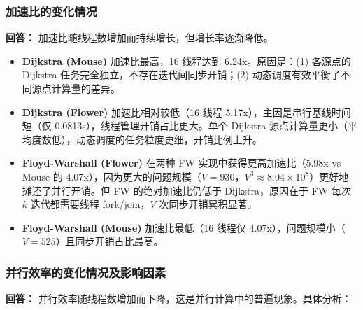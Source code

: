 \documentclass{SYSUReport}
\begin{document}
\subsubsection{加速比的变化情况}

\textbf{回答：} 加速比随线程数增加而持续增长，但增长率逐渐降低。

\begin{itemize}
    \item \textbf{Dijkstra (Mouse)} 加速比最高，16 线程达到 6.24x。原因是：(1) 各源点的 Dijkstra 任务完全独立，不存在迭代间同步开销；(2) 动态调度有效平衡了不同源点计算量的差异。
    \item \textbf{Dijkstra (Flower)} 加速比相对较低（16 线程 5.17x），主因是串行基线时间短（仅 0.0813s），线程管理开销占比更大。单个 Dijkstra 源点计算量更小（平均度数低），动态调度的任务粒度更细，开销比例上升。
    \item \textbf{Floyd-Warshall (Flower)} 在两种 FW 实现中获得更高加速比（5.98x vs Mouse 的 4.07x），因为更大的问题规模（$V=930$，$V^3 \approx 8.04 \times 10^8$）更好地摊还了并行开销。但 FW 的绝对加速比仍低于 Dijkstra，原因在于 FW 每次 $k$ 迭代都需要线程 fork/join，$V$ 次同步开销累积显著。
    \item \textbf{Floyd-Warshall (Mouse)} 加速比最低（16 线程仅 4.07x），问题规模小（$V=525$）且同步开销占比最高。
\end{itemize}

\subsubsection{并行效率的变化情况及影响因素}

\textbf{回答：} 并行效率随线程数增加而下降，这是并行计算中的普遍现象。具体分析：
\end{document}
